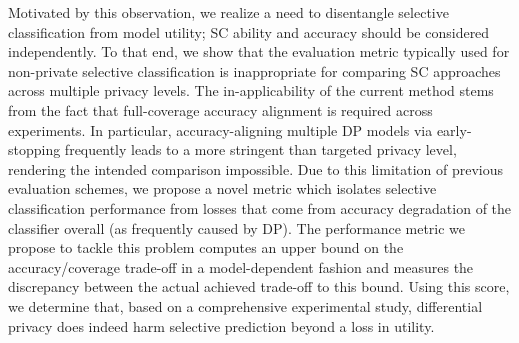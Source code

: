 Motivated by this observation, we realize a need to disentangle selective classification from model utility; SC ability and accuracy should be considered independently. To that end, we show that the evaluation metric typically used for non-private selective classification is inappropriate for comparing SC approaches across multiple privacy levels. The in-applicability of the current method stems from the fact that full-coverage accuracy alignment is required across experiments. In particular, accuracy-aligning multiple DP models via early-stopping frequently leads to a more stringent than targeted privacy level, rendering the intended comparison impossible. Due to this limitation of previous evaluation schemes, we propose a novel metric which isolates selective classification performance from losses that come from accuracy degradation of the classifier overall (as frequently caused by DP). The performance metric we propose to tackle this problem computes an upper bound on the accuracy/coverage trade-off in a model-dependent fashion and measures the discrepancy between the actual achieved trade-off to this bound. Using this score, we determine that, based on a comprehensive experimental study, differential privacy does indeed harm selective prediction beyond a loss in utility.


